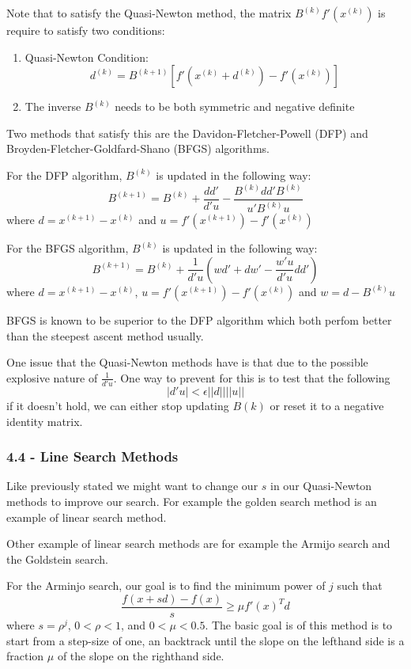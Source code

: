\documentclass{article}
\begin{document}
Note that to satisfy the Quasi-Newton method, the matrix $B^{(k)}f'(x^{(k)})$ is require to satisfy two conditions:

\begin{enumerate}
\item Quasi-Newton Condition: 
$$
d^{(k)}= B^{(k+1)}[f'(x^{(k)}+d^{(k)})-f'(x^{(k)})]
$$
\item The inverse $B^{(k)}$ needs to be both symmetric and negative definite
\end{enumerate}

Two methods that satisfy this are the Davidon-Fletcher-Powell (DFP) and Broyden-Fletcher-Goldfard-Shano (BFGS) algorithms.

For the DFP algorithm, $B^{(k)}$ is updated in the following way:
$$
B^{(k+1)} = B^{(k)} + \frac{dd'}{d'u}-\frac{B^{(k)}dd'B^{(k)}}{u'B^{(k)}u}
$$
where $d=x^{(k+1)}-x^{(k)}$ and $u=f'(x^{(k+1)})-f'(x^{(k)})$ 

For the BFGS algorithm, $B^{(k)}$ is updated in the following way:
$$
B^{(k+1)} = B^{(k)} + \frac{1}{d'u}\left(wd'+dw'-\frac{w'u}{d'u}dd'\right)
$$
where $d=x^{(k+1)}-x^{(k)}$, $u=f'(x^{(k+1)})-f'(x^{(k)})$ and $w=d-B^{(k)}u$

BFGS is known to be superior to the DFP algorithm which both perfom better than the steepest ascent method usually.

One issue that the Quasi-Newton methods have is that due to the possible explosive nature of $\frac{1}{d'u}$. One way to prevent for this is to test that the following
$$
|d'u|< \epsilon ||d|| ||u||
$$
if it doesn't hold, we can either stop updating $B{(k)}$ or reset it to a negative identity matrix.
\subsubsection*{4.4 - Line Search Methods}

Like previously stated we might want to change our $s$ in our Quasi-Newton methods to improve our search. For example the golden search method is an example of linear search method.

Other example of linear search methods are for example the Armijo search and the Goldstein search.

For the Arminjo search, our goal is to find the minimum power of $j$ such that
$$
\frac{f(x+sd)-f(x)}{s}\geq \mu f'(x)^Td
$$
where $s=\rho^j$, $0<\rho <1$, and $0<\mu<0.5$. The basic goal is of this method is to start from a step-size of one, an backtrack until the slope on the lefthand side is a fraction $\mu$ of the slope on the righthand side.
\end{document}
